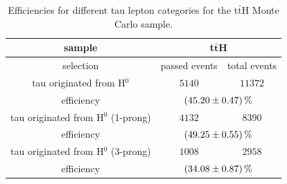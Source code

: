 \begin{table}[htbp]
		\centering
                \footnotesize
                \renewcommand{\arraystretch}{1.2}
		\begin{tabular*}{\linewidth}{@{\extracolsep{\fill}}ccc}
		\hline
		\hline
		\textbf{sample}    & \multicolumn{2}{c}{\textbf{t$\bar{\textbf{t}}$H}} 
		\\
		\hline
		selection   & passed events      & total events
		\\ 
		\hline
                tau originated from H$^0$        & $5140$          & $11372$
		\\
		efficiency                     & \multicolumn{2}{c}{$\SI{45.20\pm 0.47}{\percent}$}
		\\
		\hline
                tau originated from H$^0$ (1-prong)         & $4132$          & $8390$
		\\
		efficiency                     & \multicolumn{2}{c}{$\SI{49.25\pm 0.55}{\percent}$}
		\\
		\hline
                tau originated from H$^0$ (3-prong)         & $1008$          & $2958$
		\\
		efficiency                    & \multicolumn{2}{c}{$\SI{34.08\pm 0.87}{\percent}$}
		\\
		\hline
		\hline
		\end{tabular*}
		\caption[Efficiencies for the t$\bar{\text{t}}$H sample.]{Efficiencies for different tau lepton categories for the t$\bar{\text{t}}$H Monte Carlo sample.}
		\label{ttbarttHEffTable}
          \renewcommand{\arraystretch}{1}
\end{table}
%
%	
